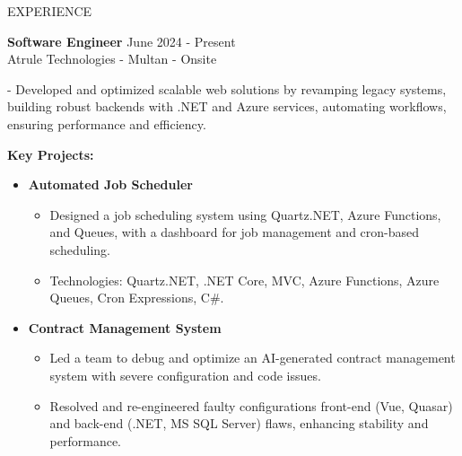 \documentclass{resume} %
\begin{document}


\begin{rSection}{EXPERIENCE}
	
	\textbf{Software Engineer} \hfill June 2024 - Present\\
	Atrule Technologies - Multan - Onsite %
		\itemsep 1pt {} 
				
		\item - Developed and optimized scalable web solutions by revamping legacy systems, building robust backends with .NET and Azure services, automating workflows, ensuring performance and efficiency.
		
		
		\textbf{Key Projects:}
		\begin{itemize}
			\itemsep -5pt {} 
			\item \textbf {Automated Job Scheduler} 
			\begin{itemize}
				\itemsep -5pt {} 
				\item Designed a job scheduling system using Quartz.NET, Azure Functions, and Queues, with a dashboard for job management and cron-based scheduling.			
				\item Technologies: Quartz.NET, .NET Core, MVC, Azure Functions, Azure Queues, Cron Expressions, C\#. 
			\end{itemize}
				\item \textbf {Contract Management System} 
			\begin{itemize}
				\itemsep -5pt {} 
				\item Led a team to debug and optimize an AI-generated contract management system with severe configuration and code issues.
				
				\item Resolved and re-engineered faulty configurations  front-end (Vue, Quasar) and back-end (.NET, MS SQL Server) flaws, enhancing stability and performance.
				

\end{itemize}
\end{itemize}
\end{rSection}
\end{document}
